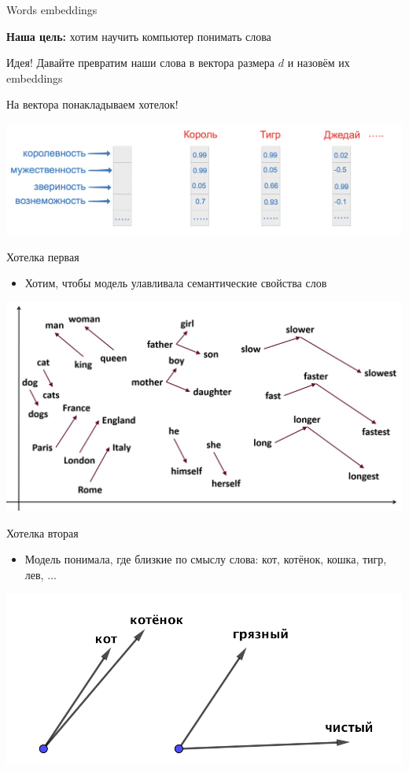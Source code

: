 \documentclass[notes,12pt, aspectratio=169]{beamer}
\newenvironment{wideitemize}{\itemize\addtolength{\itemsep}{10pt}}{\enditemize}
\begin{document}
\begin{frame}{Words embeddings}
\begin{wideitemize} 
	\item \textbf{Наша цель:}  хотим научить компьютер понимать слова
	
	\item Идея! Давайте превратим наши слова в вектора размера $d$ и назовём их embeddings
	
	\item На вектора понакладываем хотелок! 
\end{wideitemize} 
\begin{center}
	\includegraphics[width=.95\linewidth]{vectors.png}
\end{center}
\end{frame} 

\begin{frame}{Хотелка первая}
\begin{itemize} 
\item Хотим, чтобы модель улавливала семантические свойства слов
\end{itemize} 

\begin{center}
\includegraphics[width=.8\linewidth]{w2v_sim.jpg}
\end{center}
\end{frame} 


\begin{frame}{Хотелка вторая}
\begin{itemize} 
\item Модель понимала, где близкие по смыслу слова: кот, котёнок, кошка, тигр, лев, ...	
\end{itemize} 

\begin{center}
\includegraphics[width=.7\linewidth]{w2v_dist.png}
\end{center}
\end{frame} 
\end{document}
